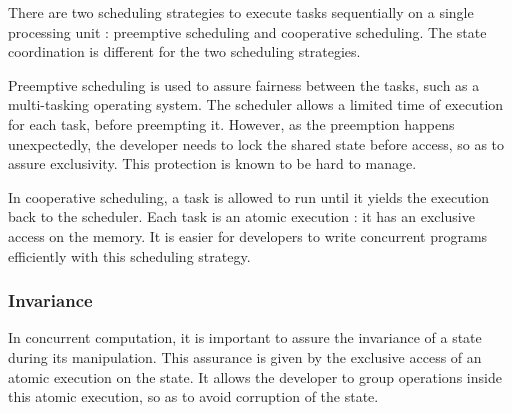There are two scheduling strategies to execute tasks sequentially on a single processing unit : preemptive scheduling and cooperative scheduling.
The state coordination is different for the two scheduling strategies.


Preemptive scheduling is used to assure fairness between the tasks, such as a multi-tasking operating system.
The scheduler allows a limited time of execution for each task, before preempting it.
However, as the preemption happens unexpectedly, the developer needs to lock the shared state before access, so as to assure exclusivity.
This protection is known to be hard to manage.

In cooperative scheduling, a task is allowed to run until it yields the execution back to the scheduler.
Each task is an atomic execution : it has an exclusive access on the memory.
It is easier for developers to write concurrent programs efficiently with this scheduling strategy.

\subsubsection{Invariance}

In concurrent computation, it is important to assure the invariance of a state during its manipulation.
This assurance is given by the exclusive access of an atomic execution on the state.
It allows the developer to group operations inside this atomic execution, so as to avoid corruption of the state.

